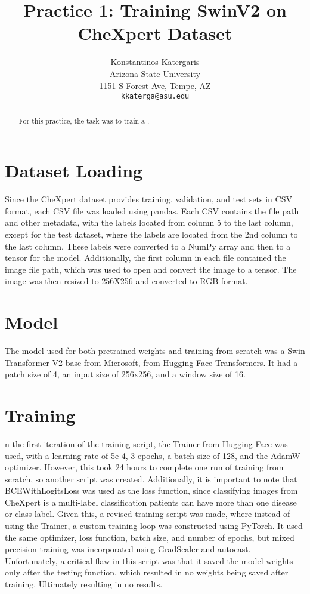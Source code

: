 \documentclass[10pt,twocolumn,letterpaper]{article}
\begin{document}
\title{Practice 1: Training SwinV2 on CheXpert Dataset }

\author{Konstantinos Katergaris\\
Arizona State University\\
1151 S Forest Ave, Tempe, AZ\\
{\tt\small kkaterga@asu.edu}}


\maketitle
\begin{abstract}
For this practice, the task was to train a .
\end{abstract}
\section{Dataset Loading}
Since the CheXpert dataset provides training, validation, and test sets in CSV format, each CSV file was loaded using pandas. Each CSV contains the file path and other metadata, with the labels located from column 5 to the last column, except for the test dataset, where the labels are located from the 2nd column to the last column. These labels were converted to a NumPy array and then to a tensor for the model. Additionally, the first column in each file contained the image file path, which was used to open and convert the image to a tensor. The image was then resized to 256X256 and converted to RGB format.
\section{Model}
The model used for both pretrained weights and training from scratch was a Swin Transformer V2 base from Microsoft, from Hugging Face Transformers. It had a patch size of 4, an input size of 256x256, and a window size of 16.
\section{Training}
n the first iteration of the training script, the Trainer from Hugging Face \cite{huggingfacetrain} was used, with a learning rate of 5e-4, 3 epochs, a batch size of 128, and the AdamW optimizer. However, this took 24 hours to complete one run of training from scratch, so another script was created. Additionally, it is important to note that BCEWithLogitsLoss was used as the loss function, since classifying images from CheXpert is a multi-label classification patients can have more than one disease or class label. Given this, a revised training script was made, where instead of using the Trainer, a custom training loop was constructed using PyTorch. It used the same optimizer, loss function, batch size, and number of epochs, but mixed precision training was incorporated using GradScaler and autocast. Unfortunately, a critical flaw in this script was that it saved the model weights only after the testing function, which resulted in no weights being saved after training. Ultimately resulting in no results.
\end{document}
